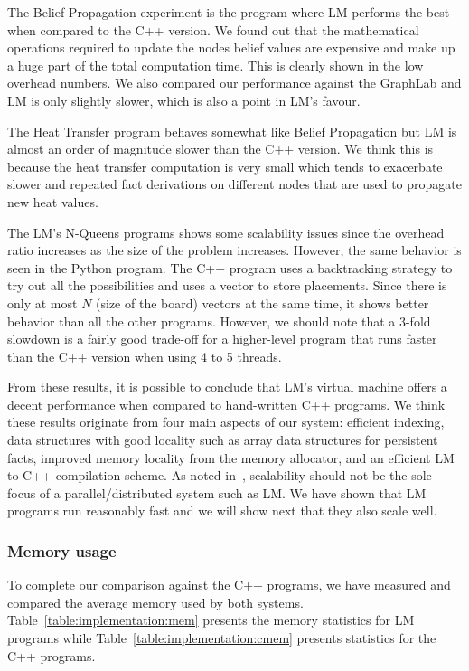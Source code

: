 The Belief Propagation experiment is the program where LM performs the best when
compared to the C++ version. We found out that the mathematical operations
required to update the nodes belief values are expensive and make up a huge part
of the total computation time. This is clearly shown in the low overhead
numbers. We also compared our performance against the GraphLab and LM is only
slightly slower, which is also a point in LM's favour.

The Heat Transfer program behaves somewhat like Belief Propagation but LM is
almost an order of magnitude slower than the C++ version. We think this is
because the heat transfer computation is very small which tends to exacerbate
slower and repeated fact derivations on different nodes that are used to
propagate new heat values.

The LM's N-Queens programs shows some scalability issues since the overhead
ratio increases as the size of the problem increases. However, the same
behavior is seen in the Python program. The C++ program uses a backtracking
strategy to try out all the possibilities and uses a vector to store placements.
Since there is only at most $N$ (size of the board) vectors at the same time, it
shows better behavior than all the other programs. However, we should note that a
3-fold slowdown is a fairly good trade-off for a higher-level program that runs
faster than the C++ version when using 4 to 5 threads.

From these results, it is possible to conclude that LM's virtual machine offers
a decent performance when compared to hand-written C++ programs. We think these
results originate from four main aspects of our system: efficient indexing,
data structures with good locality such as array data structures for persistent
facts, improved memory locality from the memory allocator, and an efficient LM
to C++ compilation scheme. As noted in~\cite{cost}, scalability should not be
the sole focus of a parallel/distributed system such as LM. We have shown that
LM programs run reasonably fast and we will show next that they also scale well.

\subsubsection{Memory usage}

To complete our comparison against the C++ programs, we have measured and
compared the average memory used by both systems.
Table~\ref{table:implementation:mem} presents the memory statistics for LM
programs while Table~\ref{table:implementation:cmem} presents statistics for the
C++ programs.

